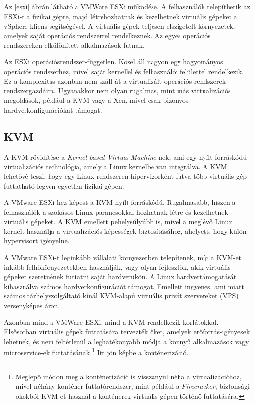 Az \ref{esxi} ábrán látható a VMWare ESXi működése. A felhasználók telepíthetik
az ESXi-t a fizikai gépre, majd létrehozhatnak és kezelhetnek virtuális gépeket
a vSphere kliens segítségével. A virtuális gépek teljesen elszigetelt
környezetek, amelyek saját operációs rendszerrel rendelkeznek. Az egyes
operációs rendszereken elkülönített alkalmazások futnak.

Az ESXi operációsrendszer-független. Közel áll nagyon egy hagyományos operációs
rendszerhez, mivel saját kernellel és felhasználói felülettel rendelkezik. Ez a
komplexitás azonban nem száll át a virtualizált operációs rendszerek
rendszergazdáira. Ugyanakkor nem olyan rugalmas, mint más virtualizációs
megoldások, például a KVM vagy a Xen, mivel csak bizonyos
hardverkonfigurációkat támogat.

\subsection{KVM}

A KVM rövidítése a \textit{Kernel-based Virtual Machine}-nek, ami egy nyílt
forráskódú virtualizációs technológia, amely a Linux kernelbe van integrálva. A
KVM lehetővé teszi, hogy egy Linux rendszeren hipervizorként futva több
virtuális gép futtatható legyen egyetlen fizikai gépen.

A VMware ESXi-hez képest a KVM nyílt forráskódú. Rugalmasabb, hiszen a
felhasználók a szokásos Linux parancsokkal hozhatnak létre és kezelhetnek
virtuális gépeket. A KVM emellett pehelysúlyúbb is, mivel a meglévő Linux
kernelt használja a virtualizációs képességek biztosításához, ahelyett, hogy
külön hypervisort igényelne.

A VMware ESXi-t leginkább vállalati környezetben telepítenek, míg a KVM-et
inkább felhőkörnyezetekben használják, vagy olyan fejlesztők, akik virtuális
gépeket szeretnének futtatni saját hardverükön. A Linux hardvertámogatását
kihasználva számos hardverkonfigurációt támogat. Emellett ingyenes, ami miatt
számos tárhelyszolgáltató kínál KVM-alapú virtuális privát szervereket (VPS)
versenyképes áron. \cite{xenkvm}

Azonban mind a VMWare ESXi, mind a KVM rendelkezik korlátokkal. Elsősorban
virtuális gépek futtatására tervezték őket, amelyek erőforrás-igényesek
lehetnek, és nem feltétlenül a leghatékonyabb módja a könnyű alkalmazások vagy
microservice-ek futtatásának.\footnote{Meglepő módon még a konténerizáció is
        visszanyúl néha a virtualizációhoz, mivel néhány konténer-futtatórendszer, mint
        például a \textit{Firecracker}, biztonsági okokból KVM-et használ a konténerek
        virtuális gépen történő futtatására.} Itt jön képbe a konténerizáció.

